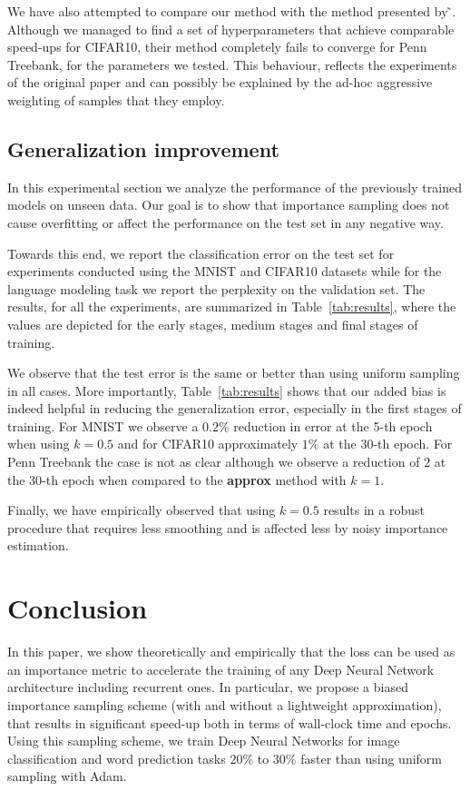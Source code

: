 \documentclass{article}
\newcommand{\citet}[1]{\citeauthor{#1} ̃\shortcite{#1}}
\begin{document}
We have also attempted to compare our method with the method presented by
\citet{loshchilov2015online}. Although we managed to find a set of
hyperparameters that achieve comparable speed-ups for CIFAR10, their method
completely fails to converge for Penn Treebank, for the parameters we tested.
This behaviour, reflects the experiments of the original paper and can possibly
be explained by the ad-hoc aggressive weighting of samples that they employ.

\subsection{Generalization improvement}

In this experimental section we analyze the performance of the previously
trained models on unseen data. Our goal is to show that importance sampling
does not cause overfitting or affect the performance on the test set in any
negative way.

Towards this end, we report the classification error on the test set for
experiments conducted using the MNIST and CIFAR10 datasets while for the
language modeling task we report the perplexity on the validation set.  The
results, for all the experiments, are summarized in Table~\ref{tab:results},
where the values are depicted for the early stages, medium stages and final
stages of training.

We observe that the test error is the same or better than using uniform
sampling in all cases. More importantly, Table~\ref{tab:results} shows that our
added bias is indeed helpful in reducing the generalization error, especially
in the first stages of training. For MNIST we observe a $0.2\%$ reduction in
error at the 5-th epoch when using $k=0.5$ and for CIFAR10 approximately $1\%$
at the 30-th epoch. For Penn Treebank the case is not as clear although we
observe a reduction of $2$ at the 30-th epoch when compared to the
\textbf{approx} method with $k=1$.

Finally, we have empirically observed that using $k=0.5$ results in a robust
procedure that requires less smoothing and is affected less by noisy importance
estimation.

\section{Conclusion}

In this paper, we show theoretically and empirically that the loss can be used
as an importance metric to accelerate the training of any Deep Neural Network
architecture including recurrent ones. In particular, we propose a biased
importance sampling scheme (with and without a lightweight approximation), that
results in significant speed-up both in terms of wall-clock time and epochs.
Using this sampling scheme, we train Deep Neural Networks for image
classification and word prediction tasks $20\%$ to $30\%$ faster than using
uniform sampling with Adam.
\end{document}
